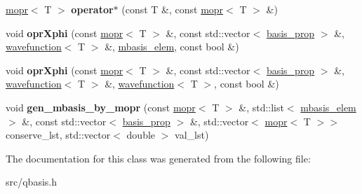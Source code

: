 \begin{DoxyCompactItemize}
\mbox{\label{classqbasis_1_1mopr_ad17b2f7a947c84f618bab4d589150deb}} 
\hyperlink{classqbasis_1_1mopr}{mopr}$<$ T $>$ {\bfseries operator$\ast$} (const T \&, const \hyperlink{classqbasis_1_1mopr}{mopr}$<$ T $>$ \&)
\item 
\mbox{\label{classqbasis_1_1mopr_a3fec6e182555899e170646f231d6d759}} 
void {\bfseries opr\+Xphi} (const \hyperlink{classqbasis_1_1mopr}{mopr}$<$ T $>$ \&, const std\+::vector$<$ \hyperlink{classqbasis_1_1basis__prop}{basis\+\_\+prop} $>$ \&, \hyperlink{classqbasis_1_1wavefunction}{wavefunction}$<$ T $>$ \&, \hyperlink{classqbasis_1_1mbasis__elem}{mbasis\+\_\+elem}, const bool \&)
\item 
\mbox{\label{classqbasis_1_1mopr_a2579cd6e4389cbf1e32d3addc3733f85}} 
void {\bfseries opr\+Xphi} (const \hyperlink{classqbasis_1_1mopr}{mopr}$<$ T $>$ \&, const std\+::vector$<$ \hyperlink{classqbasis_1_1basis__prop}{basis\+\_\+prop} $>$ \&, \hyperlink{classqbasis_1_1wavefunction}{wavefunction}$<$ T $>$ \&, \hyperlink{classqbasis_1_1wavefunction}{wavefunction}$<$ T $>$, const bool \&)
\item 
\mbox{\label{classqbasis_1_1mopr_a4eb4692297545b8baf275681ed69f625}} 
void {\bfseries gen\+\_\+mbasis\+\_\+by\+\_\+mopr} (const \hyperlink{classqbasis_1_1mopr}{mopr}$<$ T $>$ \&, std\+::list$<$ \hyperlink{classqbasis_1_1mbasis__elem}{mbasis\+\_\+elem} $>$ \&, const std\+::vector$<$ \hyperlink{classqbasis_1_1basis__prop}{basis\+\_\+prop} $>$ \&, std\+::vector$<$ \hyperlink{classqbasis_1_1mopr}{mopr}$<$ T $>$$>$ conserve\+\_\+lst, std\+::vector$<$ double $>$ val\+\_\+lst)
\end{DoxyCompactItemize}


The documentation for this class was generated from the following file\+:\begin{DoxyCompactItemize}
\item 
src/qbasis.\+h\end{DoxyCompactItemize}
